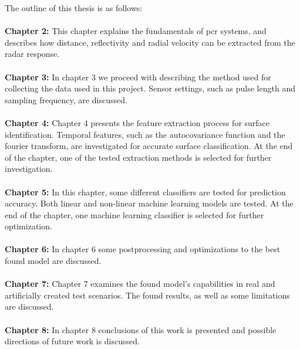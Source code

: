 The outline of this thesis is as follows:
\\ \\
\noindent\textbf{Chapter 2:} This chapter explains the fundamentals of \gls{pcr} systems, and describes how distance, reflectivity and radial velocity can be extracted from the radar response. 
\\ \\
\noindent\textbf{Chapter 3:} In chapter 3 we proceed with describing the method used for collecting the data used in this project. Sensor settings, such as pulse length and sampling frequency, are discussed. 
\\ \\
\noindent\textbf{Chapter 4:} Chapter 4 presents the feature extraction process for surface identification. Temporal features, such as the autocovariance function and the fourier transform, are investigated for accurate surface classification. At the end of the chapter, one of the tested extraction methods is selected for further investigation. 
\\ \\
\noindent\textbf{Chapter 5:}  In this chapter, some different classifiers are tested for prediction accuracy. Both linear and non-linear machine learning models are tested. At the end of the chapter, one machine learning classifier is selected for further optimization. 
\\ \\
\noindent\textbf{Chapter 6:} In chapter 6 some postprocessing and optimizations to the best found model are discussed. 
\\ \\
\noindent\textbf{Chapter 7:} Chapter 7 examines the found model's capabilities in real and artificially created test scenarios. The found results, as well as some limitations are discussed.
\\ \\
\noindent\textbf{Chapter 8:} In chapter 8 conclusions of this work is presented and possible directions of future work is discussed. 










